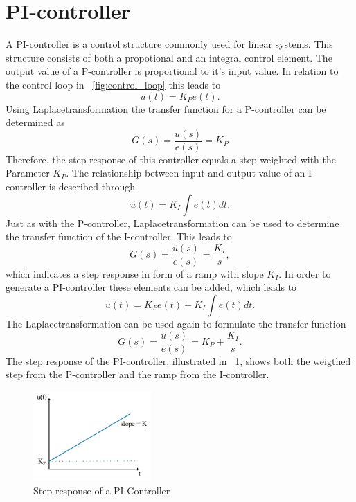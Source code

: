 \section{PI-controller}
A PI-controller is a control structure commonly used for linear systems. This structure consists of both a propotional and an integral control element.
The output value of a P-controller is proportional to it's input value. In relation to the control loop in \figurename~\ref{fig:control_loop} this leads to
\begin{equation}
    u(t) = K_{P}e(t).
 \label{eq:p_contr_1}
\end{equation}
Using Laplacetransformation the transfer function for a P-controller can be determined as
\begin{equation}
    G(s) = \frac{u(s)}{e(s)} = K_{P}
 \label{eq:p_contr_2}
\end{equation}
Therefore, the step response of this controller equals a step weighted with the Parameter $K_{P}$.
The relationship between input and output value of an I-controller is described through
\begin{equation}
    u(t) = K_{I}\int e(t) dt.
 \label{eq:i_contr_1}
\end{equation}
Just as with the P-controller, Laplacetransformation can be used to determine the transfer function of the I-controller.
This leads to
\begin{equation}
    G(s) = \frac{u(s)}{e(s)} = \frac{K_{I}}{s},
 \label{eq:i_contr_2}
\end{equation}
which indicates a step response in form of a ramp with slope $K_{I}$.
In order to generate a PI-controller these elements can be added, which leads to
\begin{equation}
    u(t) = K_{P}e(t) + K_{I}\int e(t) dt.
 \label{eq:pi_contr_1}
\end{equation}
The Laplacetransformation can be used again to formulate the transfer function
\begin{equation}
    G(s) = \frac{u(s)}{e(s)} =  K_{P} + \frac{K_{I}}{s}.
 \label{eq:pi_contr_2}
\end{equation}
The step response of the PI-controller, illustrated in \figurename~\ref{fig:step_resp_pi}, shows both the weigthed step from the P-controller and the ramp from the I-controller.

\begin{figure}[h]
   \centering
   \includegraphics[width=0.4\textwidth]{images/step_resp_pi.jpg}
   \caption[Step response of a PI-Controller]{Step response of a PI-Controller}
   \label{fig:step_resp_pi}
 \end{figure}

